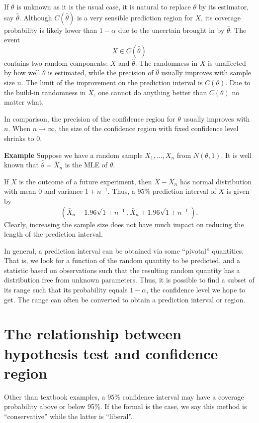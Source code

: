 If $\theta$ is unknown as it is the usual case, it is natural to replace $\theta$ by its estimator,
say $\hat \theta$. Although $C(\hat \theta)$ is a very sensible prediction region
for $X$, its coverage probability is likely lower than $1 - \alpha$ due to the
uncertain brought in by $\hat \theta$.
The event
\[
X \in C(\hat \theta)
\]
contains two random components: $X$ and $\hat \theta$.
The randomness in $X$ is unaffected by how well $\theta$ is estimated,
while the precision of $\hat \theta$ usually improves with sample size $n$.
The limit of the improvement on the prediction interval is $C(\theta)$.
Due to the build-in randomness in $X$, one cannot do anything
better than $C(\theta)$ no matter what.

In comparison, the precision of the confidence region for $\theta$
usually improves with $n$. When $n \to \infty$, the size of the
confidence region with fixed confidence level shrinks to 0.

\vs
\noindent
{\bf Example} Suppose we have a random sample
$X_1, \ldots, X_n$ from $N(\theta, 1)$. It is well known that
$\hat \theta = \bar X_n$ is the MLE of $\theta$.

If $X$ is the outcome of a future experiment, then
$X - \bar X_n$ has normal distribution with mean 0 and variance 
$1 + n^{-1}$.
Thus, a 95\% prediction interval of $X$ is given by
\[
(\bar X_n - 1.96 \sqrt{1+n^{-1}}, \bar X_n + 1.96 \sqrt{1+n^{-1}}).
\]
Clearly, increasing the sample size does not have much
impact on reducing the length of the prediction interval.

In general, a prediction interval can be obtained via some ``pivotal''
quantities. That is, we look for a function of the random quantity
to be predicted, and a statistic based on observations such that
the resulting random quantity has a distribution free from unknown
parameters. Thus, it is possible to find a subset of its range
such that its probability equals $1-\alpha$, the confidence level
we hope to get. The range can often be converted to obtain
a prediction interval or region.


\section[Hypothesis test and confidence region]{The relationship 
between hypothesis test and confidence region}

Other than textbook examples, a 95\% confidence interval may have
a coverage probability above or below 95\%. If the formal is the case,
we say this method is ``conservative'' while the latter is ``liberal''.

